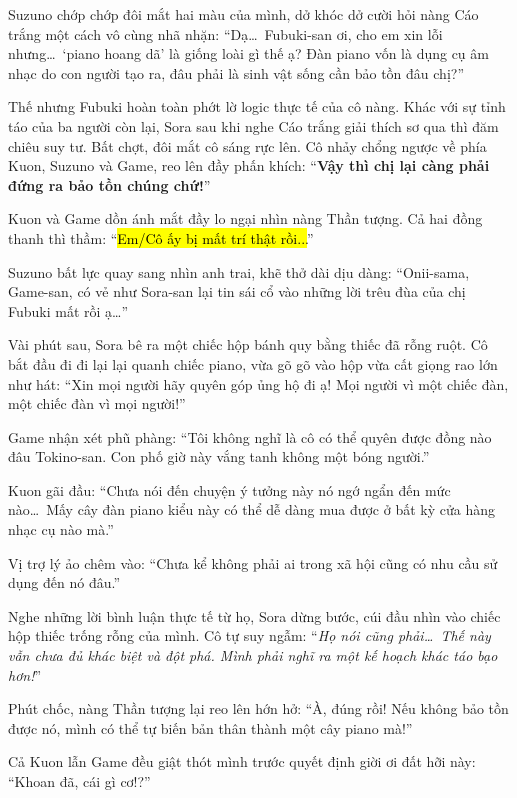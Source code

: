 \documentclass[../main.tex]{subfiles}
\begin{document}
Suzuno chớp chớp đôi mắt hai màu của mình, dở khóc dở cười hỏi nàng Cáo trắng một cách vô cùng nhã nhặn: ``Dạ\dots\ Fubuki-san ơi, cho em xin lỗi nhưng\dots\ `piano hoang dã' là giống loài gì thế ạ? Đàn piano vốn là dụng cụ âm nhạc do con người tạo ra, đâu phải là sinh vật sống cần bảo tồn đâu chị?''

Thế nhưng Fubuki hoàn toàn phớt lờ logic thực tế của cô nàng. Khác với sự tỉnh táo của ba người còn lại, Sora sau khi nghe Cáo trắng giải thích sơ qua thì đăm chiêu suy tư. Bất chợt, đôi mắt cô sáng rực lên. Cô nhảy chổng ngược về phía Kuon, Suzuno và Game, reo lên đầy phấn khích: ``\textbf{Vậy thì chị lại càng phải đứng ra bảo tồn chúng chứ!}''

Kuon và Game dồn ánh mắt đầy lo ngại nhìn nàng Thần tượng. Cả hai đồng thanh thì thầm: ``\hl{Em/Cô ấy bị mất trí thật rồi...}''

Suzuno bất lực quay sang nhìn anh trai, khẽ thở dài dịu dàng: ``Onii-sama, Game-san, có vẻ như Sora-san lại tin sái cổ vào những lời trêu đùa của chị Fubuki mất rồi ạ\dots''

\ct

Vài phút sau, Sora bê ra một chiếc hộp bánh quy bằng thiếc đã rỗng ruột. Cô bắt đầu đi đi lại lại quanh chiếc piano, vừa gõ gõ vào hộp vừa cất giọng rao lớn như hát: ``Xin mọi người hãy quyên góp ủng hộ đi ạ! Mọi người vì một chiếc đàn, một chiếc đàn vì mọi người!''


Game nhận xét phũ phàng: ``Tôi không nghĩ là cô có thể quyên được đồng nào đâu Tokino-san. Con phố giờ này vắng tanh không một bóng người.''

Kuon gãi đầu: ``Chưa nói đến chuyện ý tưởng này nó ngớ ngẩn đến mức nào\dots\ Mấy cây đàn piano kiểu này có thể dễ dàng mua được ở bất kỳ cửa hàng nhạc cụ nào mà.''

Vị trợ lý ảo chêm vào: ``Chưa kể không phải ai trong xã hội cũng có nhu cầu sử dụng đến nó đâu.''

Nghe những lời bình luận thực tế từ họ, Sora dừng bước, cúi đầu nhìn vào chiếc hộp thiếc trống rỗng của mình. Cô tự suy ngẫm: ``\textit{Họ nói cũng phải\dots\ Thế này vẫn chưa đủ khác biệt và đột phá. Mình phải nghĩ ra một kế hoạch khác táo bạo hơn!}''

Phút chốc, nàng Thần tượng lại reo lên hớn hở: ``À, đúng rồi! Nếu không bảo tồn được nó, mình có thể tự biến bản thân thành một cây piano mà!''

Cả Kuon lẫn Game đều giật thót mình trước quyết định giời ơi đất hỡi này: ``Khoan đã, cái gì cơ!?''
\end{document}
